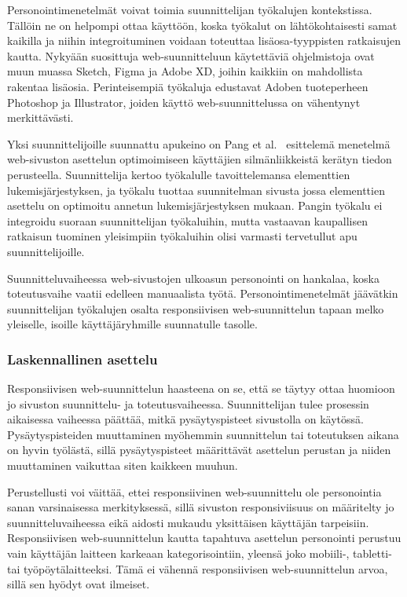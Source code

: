 \documentclass[finnish, 12pt, a4paper, elec, utf8, a-1b, online]{aaltothesis}
\begin{document}
Personointimenetelmät voivat toimia suunnittelijan työkalujen kontekstissa.
Tällöin ne on helpompi ottaa käyttöön, koska työkalut on lähtökohtaisesti samat
kaikilla ja niihin integroituminen voidaan toteuttaa lisäosa-tyyppisten
ratkaisujen kautta. Nykyään suosittuja web-suunnitteluun käytettäviä
ohjelmistoja ovat muun muassa Sketch, Figma ja Adobe XD, joihin kaikkiin on
mahdollista rakentaa lisäosia. Perinteisempiä työkaluja edustavat Adoben
tuoteperheen Photoshop ja Illustrator, joiden käyttö web-suunnittelussa on
vähentynyt merkittävästi.

Yksi suunnittelijoille suunnattu apukeino on Pang et al.~\cite{10.1145/2980179.2982422}
esittelemä menetelmä web-sivuston asettelun optimoimiseen käyttäjien
silmänliikkeistä kerätyn tiedon perusteella. Suunnittelija kertoo työkalulle
tavoittelemansa elementtien lukemisjärjestyksen, ja työkalu tuottaa suunnitelman
sivusta jossa elementtien asettelu on optimoitu annetun lukemisjärjestyksen
mukaan. Pangin työkalu ei integroidu suoraan suunnittelijan työkaluihin, mutta
vastaavan kaupallisen ratkaisun tuominen yleisimpiin työkaluihin olisi varmasti
tervetullut apu suunnittelijoille.

Suunnitteluvaiheessa web-sivustojen ulkoasun personointi on hankalaa, koska
toteutusvaihe vaatii edelleen manuaalista työtä. Personointimenetelmät jäävätkin
suunnittelijan työkalujen osalta responsiivisen web-suunnittelun tapaan melko
yleiselle, isoille käyttäjäryhmille suunnatulle tasolle.

\subsubsection{Laskennallinen asettelu}

Responsiivisen web-suunnittelun haasteena on se, että se täytyy ottaa huomioon
jo sivuston suunnittelu- ja toteutusvaiheessa. Suunnittelijan tulee prosessin
aikaisessa vaiheessa päättää, mitkä pysäytyspisteet sivustolla on käytössä.
Pysäytyspisteiden muuttaminen myöhemmin suunnittelun tai toteutuksen aikana on
hyvin työlästä, sillä pysäytyspisteet määrittävät asettelun perustan ja niiden
muuttaminen vaikuttaa siten kaikkeen muuhun.

Perustellusti voi väittää, ettei responsiivinen web-suunnittelu ole personointia
sanan varsinaisessa merkityksessä, sillä sivuston responsiviisuus on määritelty
jo suunnitteluvaiheessa eikä aidosti mukaudu yksittäisen käyttäjän tarpeisiin.
Responsiivisen web-suunnittelun kautta tapahtuva asettelun personointi perustuu
vain käyttäjän laitteen karkeaan kategorisointiin, yleensä joko mobiili-,
tabletti- tai työpöytälaitteeksi. Tämä ei vähennä responsiivisen
web-suunnittelun arvoa, sillä sen hyödyt ovat ilmeiset.
\end{document}
